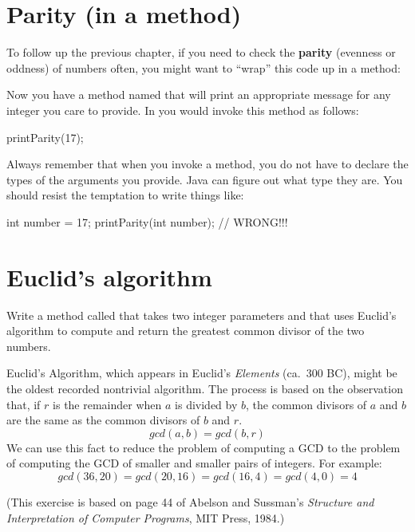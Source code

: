 \section{Parity (in a method)}
\label{alternative}


To follow up the previous chapter, if you need to check the {\bf parity} (evenness or oddness) of numbers often, you might want to ``wrap'' this code up in a method:


Now you have a method named  that will print an appropriate message for any integer you care to provide.
In  you would invoke this method as follows:

\begin{code}
printParity(17);
\end{code}

Always remember that when you invoke a method, you do not have to declare the types of the arguments you provide.
Java can figure out what type they are.
You should resist the temptation to write things like:

\begin{code}
int number = 17;
printParity(int number);        // WRONG!!!
\end{code}


\section{Euclid's algorithm}

\begin{exercise}
\label{gcd}

Write a method called  that takes two integer parameters and that uses Euclid's algorithm to compute and return the greatest common divisor of the two numbers.

Euclid's Algorithm, which appears in Euclid's {\it Elements} (ca.~300 BC), might be the oldest recorded nontrivial algorithm.
The process is based on the observation that, if $r$ is the remainder when $a$ is divided by $b$, the common divisors of $a$ and $b$ are the same as the common divisors of $b$ and $r$.
\[ gcd(a, b) = gcd(b, r) \]
%
We can use this fact to reduce the problem of computing a GCD to the problem of computing the GCD of smaller and smaller pairs of integers.
For example:
\[ gcd(36, 20) = gcd(20, 16) = gcd(16, 4) = gcd(4, 0) = 4 \]


(This exercise is based on page 44 of Abelson and Sussman's {\it Structure and Interpretation of Computer Programs}, MIT Press, 1984.)

\end{exercise}


